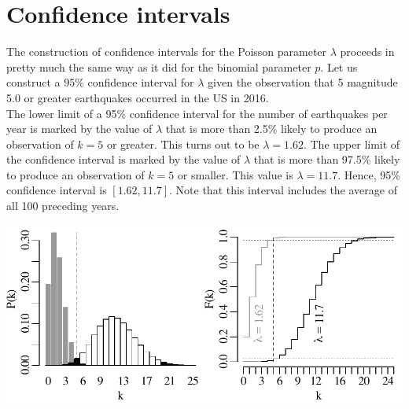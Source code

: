 \section{Confidence intervals}
\label{sec:poisCI}

The construction of confidence intervals for the Poisson parameter
$\lambda$ proceeds in pretty much the same way as it did for the
binomial parameter $p$. Let us construct a 95\% confidence interval
for $\lambda$ given the observation that 5 magnitude 5.0 or greater
earthquakes occurred in the US in 2016.\\

The lower limit of a 95\% confidence interval for the number of
earthquakes per year is marked by the value of $\lambda$ that is more
than 2.5\% likely to produce an observation of $k=5$ or greater. This
turns out to be $\lambda=1.62$. The upper limit of the confidence
interval is marked by the value of $\lambda$ that is more than 97.5\%
likely to produce an observation of $k=5$ or smaller. This value is
$\lambda=11.7$. Hence, 95\% confidence interval is $[1.62, 11.7]$.
Note that this interval includes the average of all 100 preceding
years. \\

\noindent\begin{minipage}[t][][b]{.6\textwidth}
  \includegraphics[width=\textwidth]{../figures/poisci.pdf}\\
\end{minipage}
\begin{minipage}[t][][t]{.4\textwidth}
  \label{fig:poisci}
\end{minipage}

